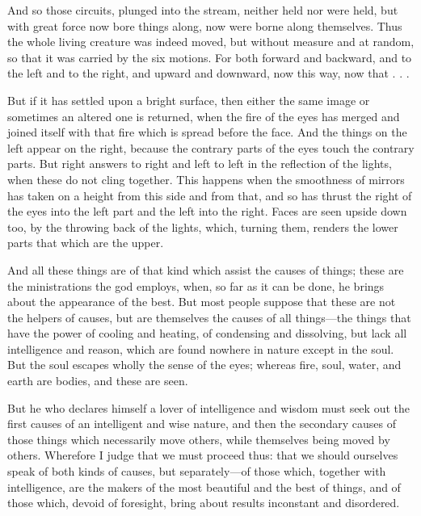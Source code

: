  And so those circuits, plunged into the stream, neither held nor were held, but with great force now bore things along, now were borne along themselves. Thus the whole living creature was indeed moved, but without measure and at random, so that it was carried by the six motions. For both forward and backward, and to the left and to the right, and upward and downward, now this way, now that . . .

 But if it has settled upon a bright surface, then either the same image or sometimes an altered one is returned, when the fire of the eyes has merged and joined itself with that fire which is spread before the face. And the things on the left appear on the right, because the contrary parts of the eyes touch the contrary parts. But right answers to right and left to left in the reflection of the lights, when these do not cling together. This happens when the smoothness of mirrors has taken on a height from this side and from that, and so has thrust the right of the eyes into the left part and the left into the right. Faces are seen upside down too, by the throwing back of the lights, which, turning them, renders the lower parts that which are the upper.

 And all these things are of that kind which assist the causes of things; these are the ministrations the god employs, when, so far as it can be done, he brings about the appearance of the best. But most people suppose that these are not the helpers of causes, but are themselves the causes of all things—the things that have the power of cooling and heating, of condensing and dissolving, but lack all intelligence and reason, which are found nowhere in nature except in the soul. But the soul escapes wholly the sense of the eyes; whereas fire, soul, water, and earth are bodies, and these are seen.

 But he who declares himself a lover of intelligence and wisdom must seek out the first causes of an intelligent and wise nature, and then the secondary causes of those things which necessarily move others, while themselves being moved by others. Wherefore I judge that we must proceed thus: that we should ourselves speak of both kinds of causes, but separately—of those which, together with intelligence, are the makers of the most beautiful and the best of things, and of those which, devoid of foresight, bring about results inconstant and disordered.

